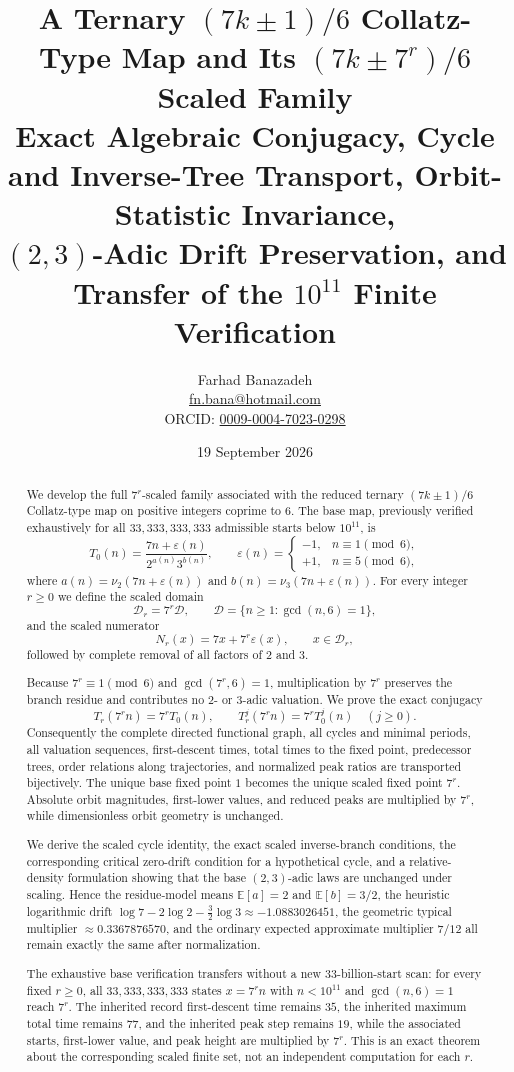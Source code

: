 \documentclass[11pt]{article}
\title{\textbf{A Ternary $(7k\pm1)/6$ Collatz-Type Map and Its $(7k\pm7^r)/6$ Scaled Family}\\[2mm]
\large Exact Algebraic Conjugacy, Cycle and Inverse-Tree Transport, Orbit-Statistic Invariance,\\
$(2,3)$-Adic Drift Preservation, and Transfer of the $10^{11}$ Finite Verification}
\author{Farhad Banazadeh\\\href{mailto:fn.bana@hotmail.com}{fn.bana@hotmail.com}\\ORCID: \href{https://orcid.org/0009-0004-7023-0298}{0009-0004-7023-0298}}
\date{19 September 2026}
\newcommand{\eps}{\varepsilon}
\begin{document}
\maketitle

\begin{abstract}
We develop the full $7^r$-scaled family associated with the reduced ternary $(7k\pm1)/6$ Collatz-type map on positive integers coprime to $6$. The base map, previously verified exhaustively for all $33,333,333,333$ admissible starts below $10^{11}$, is
\[
T_0(n)=\frac{7n+\eps(n)}{2^{a(n)}3^{b(n)}},\qquad
\eps(n)=\begin{cases}-1,&n\equiv1\pmod6,\\+1,&n\equiv5\pmod6,\end{cases}
\]
where $a(n)=\nu_2(7n+\eps(n))$ and $b(n)=\nu_3(7n+\eps(n))$. For every integer $r\ge0$ we define the scaled domain
\[
\mathcal D_r=7^r\mathcal D,\qquad \mathcal D=\{n\ge1:\gcd(n,6)=1\},
\]
and the scaled numerator
\[
N_r(x)=7x+7^r\eps(x),\qquad x\in\mathcal D_r,
\]
followed by complete removal of all factors of $2$ and $3$.

Because $7^r\equiv1\pmod6$ and $\gcd(7^r,6)=1$, multiplication by $7^r$ preserves the branch residue and contributes no $2$- or $3$-adic valuation. We prove the exact conjugacy
\[
T_r(7^r n)=7^rT_0(n),\qquad
T_r^j(7^r n)=7^rT_0^j(n)\quad(j\ge0).
\]
Consequently the complete directed functional graph, all cycles and minimal periods, all valuation sequences, first-descent times, total times to the fixed point, predecessor trees, order relations along trajectories, and normalized peak ratios are transported bijectively. The unique base fixed point $1$ becomes the unique scaled fixed point $7^r$. Absolute orbit magnitudes, first-lower values, and reduced peaks are multiplied by $7^r$, while dimensionless orbit geometry is unchanged.

We derive the scaled cycle identity, the exact scaled inverse-branch conditions, the corresponding critical zero-drift condition for a hypothetical cycle, and a relative-density formulation showing that the base $(2,3)$-adic laws are unchanged under scaling. Hence the residue-model means $\mathbb E[a]=2$ and $\mathbb E[b]=3/2$, the heuristic logarithmic drift $\log7-2\log2-\tfrac32\log3\approx-1.0883026451$, the geometric typical multiplier $\approx0.3367876570$, and the ordinary expected approximate multiplier $7/12$ all remain exactly the same after normalization.

The exhaustive base verification transfers without a new $33$-billion-start scan: for every fixed $r\ge0$, all $33,333,333,333$ states $x=7^rn$ with $n<10^{11}$ and $\gcd(n,6)=1$ reach $7^r$. The inherited record first-descent time remains $35$, the inherited maximum total time remains $77$, and the inherited peak step remains $19$, while the associated starts, first-lower value, and peak height are multiplied by $7^r$. This is an exact theorem about the corresponding scaled finite set, not an independent computation for each $r$.


\end{abstract}
\end{document}

